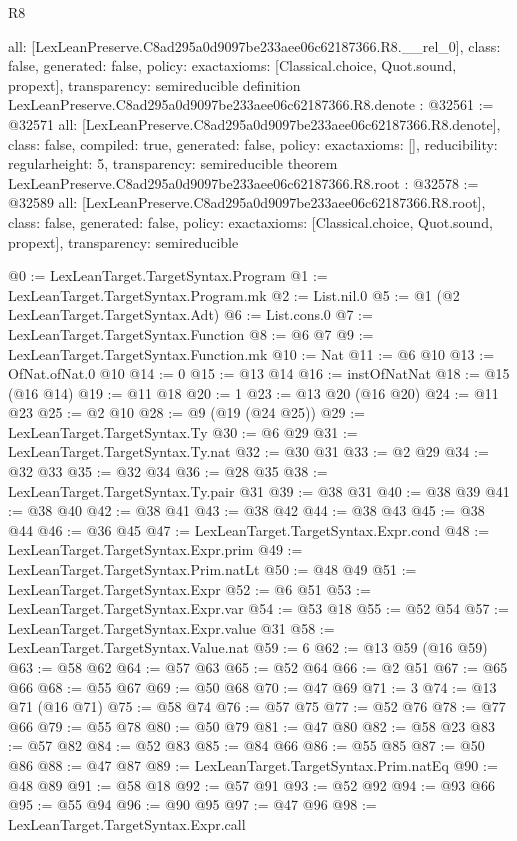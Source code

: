 \begin{lexlean}{R8}
\begin{coremodule}
{  all: [LexLeanPreserve.C8ad295a0d9097be233aee06c62187366.R8.__rel_0],
  class: false,
  generated: false,
  policy: exact{axioms: [Classical.choice, Quot.sound, propext]},
  transparency: semireducible
}
definition LexLeanPreserve.C8ad295a0d9097be233aee06c62187366.R8.denote : @32561 := @32571 {
  all: [LexLeanPreserve.C8ad295a0d9097be233aee06c62187366.R8.denote],
  class: false,
  compiled: true,
  generated: false,
  policy: exact{axioms: []},
  reducibility: regular{height: 5},
  transparency: semireducible
}
theorem LexLeanPreserve.C8ad295a0d9097be233aee06c62187366.R8.root : @32578 := @32589 {
  all: [LexLeanPreserve.C8ad295a0d9097be233aee06c62187366.R8.root],
  class: false,
  generated: false,
  policy: exact{axioms: [Classical.choice, Quot.sound, propext]},
  transparency: semireducible
}

@0 := LexLeanTarget.TargetSyntax.Program
@1 := LexLeanTarget.TargetSyntax.Program.mk
@2 := List.nil.{0}
@5 := @1 (@2 LexLeanTarget.TargetSyntax.Adt)
@6 := List.cons.{0}
@7 := LexLeanTarget.TargetSyntax.Function
@8 := @6 @7
@9 := LexLeanTarget.TargetSyntax.Function.mk
@10 := Nat
@11 := @6 @10
@13 := OfNat.ofNat.{0} @10
@14 := 0
@15 := @13 @14
@16 := instOfNatNat
@18 := @15 (@16 @14)
@19 := @11 @18
@20 := 1
@23 := @13 @20 (@16 @20)
@24 := @11 @23
@25 := @2 @10
@28 := @9 (@19 (@24 @25))
@29 := LexLeanTarget.TargetSyntax.Ty
@30 := @6 @29
@31 := LexLeanTarget.TargetSyntax.Ty.nat
@32 := @30 @31
@33 := @2 @29
@34 := @32 @33
@35 := @32 @34
@36 := @28 @35
@38 := LexLeanTarget.TargetSyntax.Ty.pair @31
@39 := @38 @31
@40 := @38 @39
@41 := @38 @40
@42 := @38 @41
@43 := @38 @42
@44 := @38 @43
@45 := @38 @44
@46 := @36 @45
@47 := LexLeanTarget.TargetSyntax.Expr.cond
@48 := LexLeanTarget.TargetSyntax.Expr.prim
@49 := LexLeanTarget.TargetSyntax.Prim.natLt
@50 := @48 @49
@51 := LexLeanTarget.TargetSyntax.Expr
@52 := @6 @51
@53 := LexLeanTarget.TargetSyntax.Expr.var
@54 := @53 @18
@55 := @52 @54
@57 := LexLeanTarget.TargetSyntax.Expr.value @31
@58 := LexLeanTarget.TargetSyntax.Value.nat
@59 := 6
@62 := @13 @59 (@16 @59)
@63 := @58 @62
@64 := @57 @63
@65 := @52 @64
@66 := @2 @51
@67 := @65 @66
@68 := @55 @67
@69 := @50 @68
@70 := @47 @69
@71 := 3
@74 := @13 @71 (@16 @71)
@75 := @58 @74
@76 := @57 @75
@77 := @52 @76
@78 := @77 @66
@79 := @55 @78
@80 := @50 @79
@81 := @47 @80
@82 := @58 @23
@83 := @57 @82
@84 := @52 @83
@85 := @84 @66
@86 := @55 @85
@87 := @50 @86
@88 := @47 @87
@89 := LexLeanTarget.TargetSyntax.Prim.natEq
@90 := @48 @89
@91 := @58 @18
@92 := @57 @91
@93 := @52 @92
@94 := @93 @66
@95 := @55 @94
@96 := @90 @95
@97 := @47 @96
@98 := LexLeanTarget.TargetSyntax.Expr.call

\end{coremodule}
\end{lexlean}
